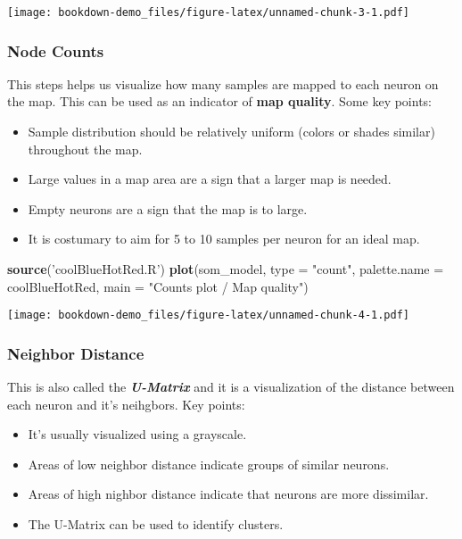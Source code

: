 \documentclass[]{book}
\newenvironment{Shaded}{\begin{snugshade}}{\end{snugshade}}
\newcommand{\KeywordTok}[1]{\textcolor[rgb]{0.13,0.29,0.53}{\textbf{{#1}}}}
\newcommand{\DataTypeTok}[1]{\textcolor[rgb]{0.13,0.29,0.53}{{#1}}}
\newcommand{\StringTok}[1]{\textcolor[rgb]{0.31,0.60,0.02}{{#1}}}
\newcommand{\NormalTok}[1]{{#1}}
\providecommand{\tightlist}{%
  \setlength{\itemsep}{0pt}\setlength{\parskip}{0pt}}
\begin{document}
\texttt{[image: bookdown-demo\_files/figure-latex/unnamed-chunk-3-1.pdf]}

\subsubsection{Node Counts}\label{node-counts}

This steps helps us visualize how many samples are mapped to each neuron
on the map. This can be used as an indicator of \textbf{map quality}.
Some key points:

\begin{itemize}
\tightlist
\item
  Sample distribution should be relatively uniform (colors or shades
  similar) throughout the map.
\item
  Large values in a map area are a sign that a larger map is needed.
\item
  Empty neurons are a sign that the map is to large.
\item
  It is costumary to aim for 5 to 10 samples per neuron for an ideal
  map.
\end{itemize}

\begin{Shaded}
\begin{Highlighting}[]
\KeywordTok{source}\NormalTok{(}\StringTok{'coolBlueHotRed.R'}\NormalTok{)}
\KeywordTok{plot}\NormalTok{(som_model,}
     \DataTypeTok{type =} \StringTok{"count"}\NormalTok{,}
     \DataTypeTok{palette.name =} \NormalTok{coolBlueHotRed,}
     \DataTypeTok{main =} \StringTok{"Counts plot / Map quality"}\NormalTok{)}
\end{Highlighting}
\end{Shaded}

\texttt{[image: bookdown-demo\_files/figure-latex/unnamed-chunk-4-1.pdf]}

\subsubsection{Neighbor Distance}\label{neighbor-distance}

This is also called the \textbf{\emph{U-Matrix}} and it is a
visualization of the distance between each neuron and it's neihgbors.
Key points:

\begin{itemize}
\tightlist
\item
  It's usually visualized using a grayscale.
\item
  Areas of low neighbor distance indicate groups of similar neurons.
\item
  Areas of high nighbor distance indicate that neurons are more
  dissimilar.
\item
  The U-Matrix can be used to identify clusters.
\end{itemize}
\end{document}
